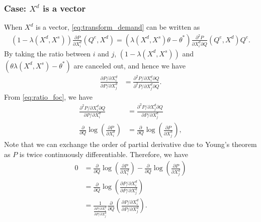 \documentclass[11pt, a4paper]{article}
\theoremstyle{remark}
\begin{document}
\subsubsection*{Case: $X^{d}$ is a vector}
When $X^{d}$ is a vector, \eqref{eq:transform_demand} can be written as
\begin{align}
    (1 -  \lambda(X^{d}, X^{s}))\frac{\partial P}{\partial X^{d}_{i}}(Q^e, X^{d}) = (  \lambda(X^{d}, X^{s})\theta  - \theta^*)\frac{\partial^2 P}{\partial X^{d}_{i}\partial Q}(Q^e, X^{d})Q^e.
\end{align}
By taking the ratio between $i$ and $j$, $(1 - \lambda(X^{d}, X^{s}))$ and  $(\theta\lambda(X^{d}, X^{s}) - \theta^{*})$ are canceled out, and hence we have
\begin{align}
    \frac{\partial P/\partial X^{d}_{i}}{\partial P/\partial X^{d}_{j}} & = \frac{\partial^2 P/\partial X^{d}_{i} \partial Q}{\partial^2 P/\partial X^{d}_{j} \partial Q}. \label{eq:ratio_foc}
\end{align}
From \eqref{eq:ratio_foc}, we have
\begin{align}
    \frac{\partial^2 P/\partial X^{d}_{i} \partial Q}{\partial P/\partial X^{d}_{i}}  &= \frac{\partial^2 P/\partial X^{d}_{j} \partial Q}{\partial P/\partial X^{d}_{j}}\\ 
    \frac{\partial }{\partial Q} \log\left( \frac{\partial P}{\partial X^{d}_{i}}\right) &= \frac{\partial }{\partial Q} \log\left( \frac{\partial P}{\partial X^{d}_{j}}\right),
\end{align}
Note that we can exchange the order of partial derivative due to Young's theorem as $P$ is twice continuously differentiable.
Therefore, we have
\begin{align}
    0 & = \frac{\partial }{\partial Q} \log\left( \frac{\partial P}{\partial X^{d}_{i}}\right) - \frac{\partial }{\partial Q} \log\left( \frac{\partial P}{\partial X^{d}_{j}}\right)\\
    & = \frac{\partial}{\partial Q}\log\left(\frac{\partial P/\partial X^{d}_{i}}{\partial P/\partial X^{d}_{j}}\right)\\
    & = \frac{1}{\frac{\partial P/\partial X^{d}_{i}}{\partial P/\partial X^{d}_{j}}} \frac{\partial}{\partial Q} \left(\frac{\partial P/\partial X^{d}_{i}}{\partial P/\partial X^{d}_{j}}\right).
    \label{eq:derivative_separable}
\end{align}
\end{document}
